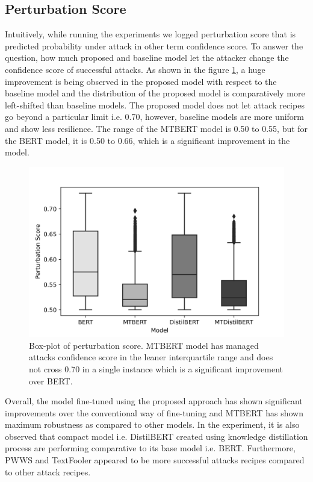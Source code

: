 \documentclass[%
	BCOR=8mm, %
	DIV=12,
	toc=bibliography, %
	toc=listof, %
	oneside, %
	egregdoesnotlikesansseriftitles, %
	]{scrbook}
\begin{document}
\subsection{Perturbation Score}
Intuitively, while running the experiments we logged perturbation score that is predicted probability under attack in other term confidence score. To answer the question, how much proposed and baseline model let the attacker change the confidence score of successful attacks. As shown in the figure \ref{fig:pertscoredist}, a huge improvement is being observed in the proposed model  with respect to the baseline model and the distribution of the proposed model is comparatively more left-shifted than baseline models. The proposed model does not let attack recipes go beyond a particular limit i.e. 0.70, however, baseline models are more uniform and show less resilience.  The range of the MTBERT model is 0.50 to 0.55, but for the BERT model, it is 0.50 to 0.66, which is a significant improvement in the model.
\begin{figure}[H]
    \centering
    \includegraphics[width=.75\linewidth]{img/PertScoreDist}
    \caption[Box-plot of perturbation score]{\small Box-plot of perturbation score. MTBERT model has managed attacks confidence score in the leaner interquartile range and does not cross 0.70 in a single instance which is a significant improvement over BERT.}
    \label{fig:pertscoredist}
\end{figure}
 Overall, the model fine-tuned using the proposed approach has shown significant improvements over the conventional way of fine-tuning and MTBERT has shown maximum robustness as compared to other models. In the experiment, it is also observed that compact model i.e. DistilBERT created using knowledge distillation process are performing comparative to its base model i.e. BERT. Furthermore, PWWS and TextFooler appeared to be more successful attacks recipes compared to other attack recipes. 
\end{document}
